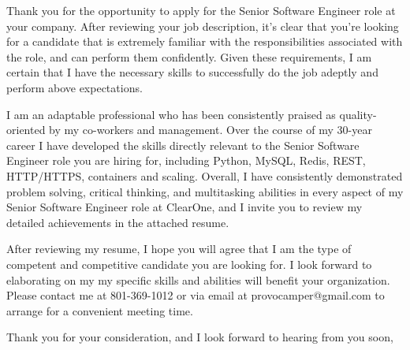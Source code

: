 \documentclass[11pt, a4paper]{awesome-cv}
\begin{document}
\makecvheader

\makelettertitle

\begin{cvletter}
Thank you for the opportunity to apply for the Senior Software Engineer role at your company. After reviewing your job description, it's clear that you're looking for a candidate that is extremely familiar with the responsibilities associated with the role, and can perform them confidently. Given these requirements, I am certain that I have the necessary skills to successfully do the job adeptly and perform above expectations.

I am an adaptable professional who has been consistently praised as quality-oriented by my co-workers and management. Over the course of my 30-year career I have developed the skills directly relevant to the Senior Software Engineer role you are hiring for, including Python, MySQL, Redis, REST, HTTP/HTTPS, containers and scaling. Overall, I have consistently demonstrated problem solving, critical thinking, and multitasking abilities in every aspect of my Senior Software Engineer role at ClearOne, and I invite you to review my detailed achievements in the attached resume.


After reviewing my resume, I hope you will agree that I am the type of competent and competitive candidate you are looking for. I look forward to elaborating on my my specific skills and abilities will benefit your organization. Please contact me at 801-369-1012 or via email at provocamper@gmail.com to arrange for a convenient meeting time.

Thank you for your consideration, and I look forward to hearing from you soon,

\end{cvletter}

\makeletterclosing
\end{document}
